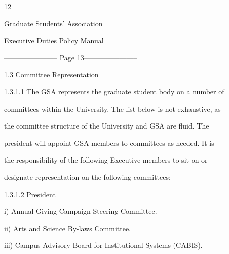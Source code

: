   

  

  

  

  

  

  

  

  

  

  

  



                                                         12  

                                        

                                      Graduate Students’ Association  

                                     Executive Duties Policy Manual  

  


----------------------- Page 13-----------------------

                         1.3       Committee Representation   

  

1.3.1.1            The GSA represents the graduate student body on a number of  

         committees within the University. The list below is not exhaustive, as  

         the  committee  structure  of  the  University  and  GSA  are  fluid.  The  

         president  will  appoint  GSA  members  to  committees  as  needed.  It  is  

         the  responsibility  of  the  following  Executive  members  to  sit  on  or  

         designate representation on the following committees:   

  

1.3.1.2            President   

  

         i)        Annual Giving Campaign Steering Committee.   

  

         ii)       Arts and Science By-laws Committee.   

  

         iii)      Campus Advisory Board for Institutional Systems (CABIS).   

  

